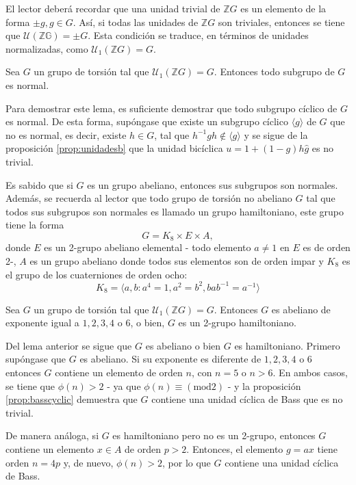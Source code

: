 El lector deberá recordar que una unidad trivial de $\mathds{Z}G$ es un elemento de la forma $\pm g, g \in G$. Así, si todas las unidades de $\mathds{Z}G$ son triviales, entonces se tiene que $\mathcal{U}(\mathds{ZG}) = \pm G$. Esta condición se traduce, en términos de unidades normalizadas, como $\mathcal{U}_1(\mathds{Z}G) = G.$
\begin{lema}
Sea $G$ un grupo de torsión tal que $\mathcal{U}_1(\mathds{Z}G) = G.$ Entonces todo subgrupo de $G$ es normal. 
\end{lema}
\begin{proof*}
Para demostrar este lema, es suficiente demostrar que todo subgrupo cíclico de $G$ es normal.  De esta forma, supóngase que existe un subgrupo cíclico $\langle g \rangle$ de $G$ que no es normal, es decir, existe $h \in G$, tal que $h^{-1}gh \notin \langle g \rangle$ y se sigue de la proposición \ref{prop:unidadesb} que la unidad bicíclica $u = 1 + (1-g)h\hat{g}$ es no trivial. 
\end{proof*}
Es sabido que si $G$ es un grupo abeliano, entonces sus subgrupos son normales. Además, se recuerda al lector que todo grupo de torsión no abeliano $G$ tal que todos sus subgrupos son normales es llamado un grupo hamiltoniano, este grupo tiene la forma \[ G = K_8\times E \times A,\] donde $E$ es un 2-grupo abeliano elemental - todo elemento $a \neq 1$ en $E$ es de orden 2-, $A$ es un grupo abeliano donde todos sus elementos son de orden impar y $K_8$ es el grupo de los cuaterniones de orden ocho: \[ K_8 = \langle a,b \colon a^4 =1 , a^2 = b^2, bab^{-1} = a^{-1} \rangle \]
\begin{proposicion}
Sea $G$ un grupo de torsión tal que $\mathcal{U}_1(\mathds{Z}G) = G$. Entonces $G$ es abeliano de exponente igual a $1,2,3,4$ o $6$, o bien, $G$ es un 2-grupo hamiltoniano.
\end{proposicion}
\begin{proof*}
Del lema anterior se sigue que $G$ es abeliano o bien  $G$ es hamiltoniano. Primero supóngase que $G$ es abeliano. Si su exponente es diferente de $1,2,3,4$ o $6$ entonces $G$ contiene un elemento de orden $n$, con $n = 5$ o $n>6$. En ambos casos, se tiene que $\phi(n) > 2$ - ya que $\phi(n) \equiv (\mbox{mod} 2)$ -  y la proposición \ref{prop:basscyclic} demuestra que $G$ contiene una unidad cíclica de Bass que es no trivial.

De manera análoga, si $G$ es hamiltoniano pero no es un 2-grupo, entonces $G$ contiene un elemento $x \in A$ de orden $p>2$. Entonces, el elemento $g = ax$ tiene orden $n=4p$ y, de nuevo, $\phi(n) > 2$, por lo que $G$ contiene una unidad cíclica de Bass. 
\end{proof*}
